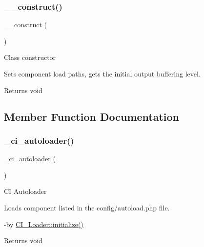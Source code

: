 \subsubsection{\texorpdfstring{\+\_\+\+\_\+construct()}{\_\_construct()}}
{\footnotesize\ttfamily \+\_\+\+\_\+construct (\begin{DoxyParamCaption}{ }\end{DoxyParamCaption})}

Class constructor

Sets component load paths, gets the initial output buffering level.

\begin{DoxyReturn}{Returns}
void 
\end{DoxyReturn}


\subsection{Member Function Documentation}
\mbox{\label{class_c_i___loader_a93471c04ea0689dcf8faa5903d201efe}} 
\subsubsection{\texorpdfstring{\+\_\+ci\+\_\+autoloader()}{\_ci\_autoloader()}}
{\footnotesize\ttfamily \+\_\+ci\+\_\+autoloader (\begin{DoxyParamCaption}{ }\end{DoxyParamCaption})\hspace{0.3cm}{\ttfamily [protected]}}

CI Autoloader

Loads component listed in the config/autoload.\+php file.

-\/by \mbox{\hyperlink{class_c_i___loader_a91098fa7d1917ce4833f284bbef12627}{C\+I\+\_\+\+Loader\+::initialize()}} \begin{DoxyReturn}{Returns}
void 
\end{DoxyReturn}
\mbox{\label{class_c_i___loader_a189d7f497e55c20fb9f82b065c20e402}} 
